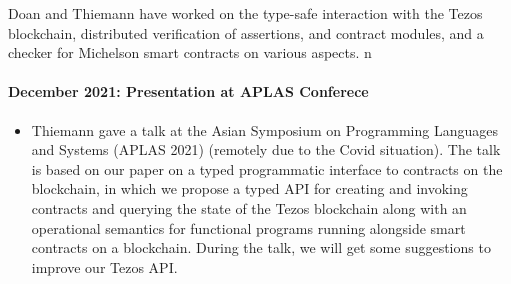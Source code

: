 \documentclass[a4paper,11pt]{article}
\begin{document}
 
Doan and Thiemann have worked on the type-safe interaction with the Tezos blockchain, distributed verification of assertions, and contract modules, and a checker for Michelson smart contracts on various aspects.
n
\paragraph{December 2021: Presentation at APLAS Conferece} 

\begin{itemize}
\item Thiemann gave a talk at the Asian Symposium on Programming Languages and Systems (APLAS 2021) (remotely due to the Covid situation). The talk is based on our paper on a typed programmatic interface to contracts on the blockchain, in which we propose a typed API for creating and invoking contracts and querying the state of the Tezos blockchain along with an operational semantics for functional programs running alongside smart contracts on a blockchain. During the talk, we will get some suggestions to improve our Tezos API.

\end{itemize}

 
\end{document}
